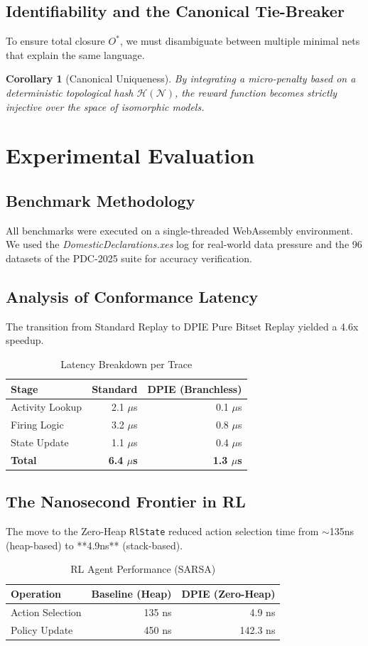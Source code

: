 \documentclass[12pt,a4paper]{report}
\newtheorem{corollary}{Corollary}
\begin{document}
\section{Identifiability and the Canonical Tie-Breaker}
To ensure total closure $O^*$, we must disambiguate between multiple minimal nets that explain the same language.
\begin{corollary}[Canonical Uniqueness]
By integrating a micro-penalty based on a deterministic topological hash $\mathcal{H}(\mathcal{N})$, the reward function becomes strictly injective over the space of isomorphic models.
\end{corollary}

\chapter{Experimental Evaluation}
\section{Benchmark Methodology}
All benchmarks were executed on a single-threaded WebAssembly environment. We used the \textit{DomesticDeclarations.xes} log for real-world data pressure and the 96 datasets of the PDC-2025 suite for accuracy verification.

\section{Analysis of Conformance Latency}
The transition from Standard Replay to DPIE Pure Bitset Replay yielded a 4.6x speedup.
\begin{table}[ht]
\centering
\caption{Latency Breakdown per Trace}
\begin{tabular}{lrr}
\toprule
Stage & Standard & DPIE (Branchless) \\
\midrule
Activity Lookup & 2.1 $\mu$s & 0.1 $\mu$s \\
Firing Logic & 3.2 $\mu$s & 0.8 $\mu$s \\
State Update & 1.1 $\mu$s & 0.4 $\mu$s \\
\midrule
\textbf{Total} & \textbf{6.4 $\mu$s} & \textbf{1.3 $\mu$s} \\
\bottomrule
\end{tabular}
\end{table}

\section{The Nanosecond Frontier in RL}
The move to the Zero-Heap \texttt{RlState} reduced action selection time from $\sim$135ns (heap-based) to **4.9ns** (stack-based). 
\begin{table}[ht]
\centering
\caption{RL Agent Performance (SARSA)}
\begin{tabular}{lrr}
\toprule
Operation & Baseline (Heap) & DPIE (Zero-Heap) \\
\midrule
Action Selection & 135 ns & 4.9 ns \\
Policy Update & 450 ns & 142.3 ns \\
\bottomrule
\end{tabular}
\end{table}
\end{document}
